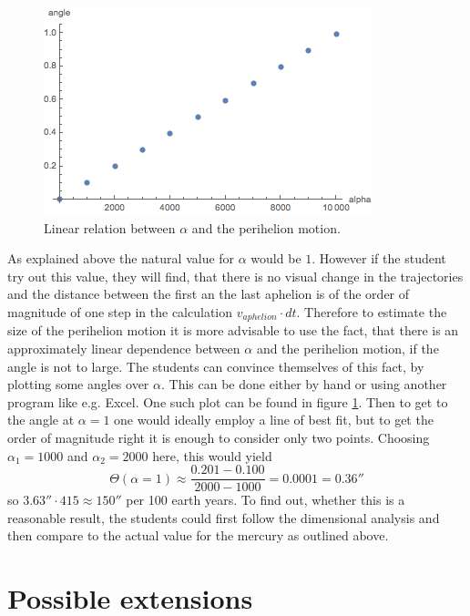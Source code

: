 \documentclass[12pt]{iopart}
\begin{document}
\begin{figure}[htb]
	\centering
	\includegraphics[width=.5\textwidth]{figs/AlphaAngle.png}
	\caption{\label{fig:AlphaAngle} Linear relation between $\alpha$ and the perihelion motion.}
\end{figure}

As explained above the natural value for $\alpha$ would be $1$. However if the student try out this value, they will find, that there is no visual change in the trajectories and the distance between the first an the last aphelion is of the order of magnitude of one step in the calculation $v_{aphelion}\cdot dt$. Therefore to estimate the size of the perihelion motion it is more advisable to use the fact, that there is an approximately linear dependence between $\alpha$ and the perihelion motion, if the angle is not to large. The students can convince themselves of this fact, by plotting some angles over $\alpha$. This can be done either by hand or using another program like e.g. Excel. One such plot can be found in figure \ref{fig:AlphaAngle}. Then to get to the angle at $\alpha=1$ one would ideally employ a line of best fit, but to get the order of magnitude right it is enough to consider only two points. Choosing $\alpha_1=1000$ and $\alpha_2=2000$ here, this would yield
\begin{equation}
	\Theta(\alpha=1) \approx \frac{0.201-0.100}{2000-1000} = 0.0001 = 0.36''
\end{equation}
so $3.63''\cdot 415\approx 150''$ per 100 earth years.
To find out, whether this is a reasonable result, the students could first follow the dimensional analysis and then compare to the actual value for the mercury  as outlined above.

\section{Possible extensions}
\end{document}
